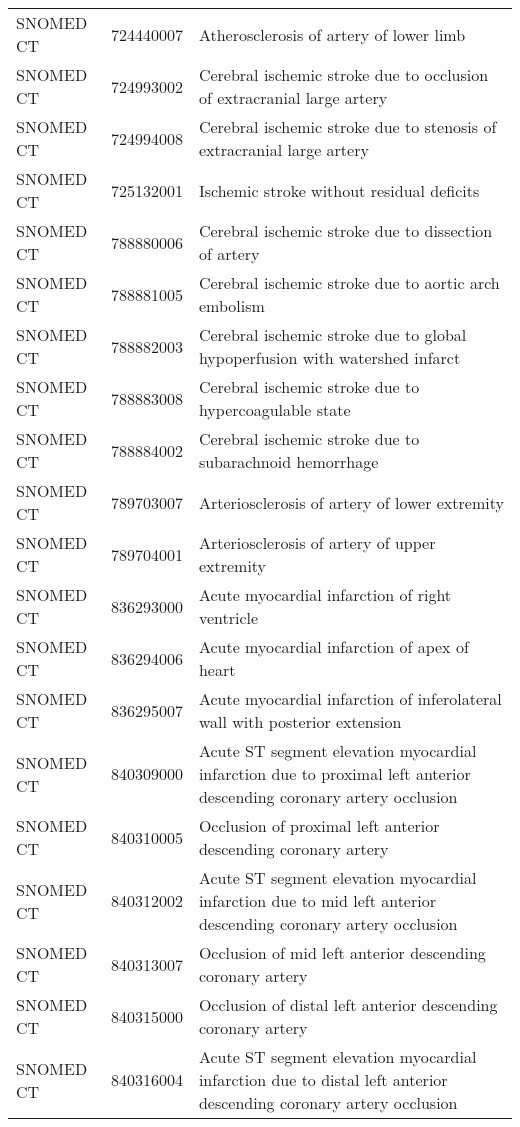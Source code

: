 \begin{longtable}{p{}p{}p{}}
  SNOMED CT & 724440007 & Atherosclerosis of artery of lower limb \\ 
  SNOMED CT & 724993002 & Cerebral ischemic stroke due to occlusion of extracranial large artery \\ 
  SNOMED CT & 724994008 & Cerebral ischemic stroke due to stenosis of extracranial large artery \\ 
  SNOMED CT & 725132001 & Ischemic stroke without residual deficits \\ 
  SNOMED CT & 788880006 & Cerebral ischemic stroke due to dissection of artery \\ 
  SNOMED CT & 788881005 & Cerebral ischemic stroke due to aortic arch embolism \\ 
  SNOMED CT & 788882003 & Cerebral ischemic stroke due to global hypoperfusion with watershed infarct \\ 
  SNOMED CT & 788883008 & Cerebral ischemic stroke due to hypercoagulable state \\ 
  SNOMED CT & 788884002 & Cerebral ischemic stroke due to subarachnoid hemorrhage \\ 
  SNOMED CT & 789703007 & Arteriosclerosis of artery of lower extremity \\ 
  SNOMED CT & 789704001 & Arteriosclerosis of artery of upper extremity \\ 
  SNOMED CT & 836293000 & Acute myocardial infarction of right ventricle \\ 
  SNOMED CT & 836294006 & Acute myocardial infarction of apex of heart \\ 
  SNOMED CT & 836295007 & Acute myocardial infarction of inferolateral wall with posterior extension \\ 
  SNOMED CT & 840309000 & Acute ST segment elevation myocardial infarction due to proximal left anterior descending coronary artery occlusion \\ 
  SNOMED CT & 840310005 & Occlusion of proximal left anterior descending coronary artery \\ 
  SNOMED CT & 840312002 & Acute ST segment elevation myocardial infarction due to mid left anterior descending coronary artery occlusion \\ 
  SNOMED CT & 840313007 & Occlusion of mid left anterior descending coronary artery \\ 
  SNOMED CT & 840315000 & Occlusion of distal left anterior descending coronary artery \\ 
  SNOMED CT & 840316004 & Acute ST segment elevation myocardial infarction due to distal left anterior descending coronary artery occlusion \\ 

\end{longtable}
